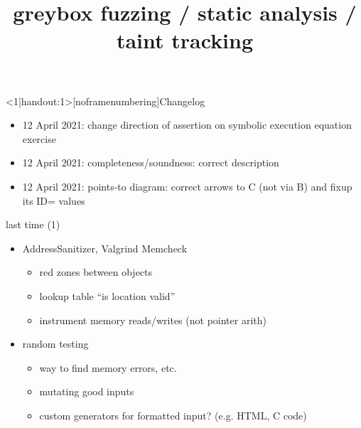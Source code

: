 \graphicspath{{./figures/}}
\title{greybox fuzzing / static analysis / taint tracking}
\date{}

\begin{frame}
    \titlepage
\end{frame}

{
\begin{frame}<1|handout:1>[noframenumbering]{Changelog}
    \begin{itemize}
    \item 12 April 2021: change direction of assertion on symbolic execution equation exercise
    \item 12 April 2021: completeness/soundness: correct description
    \item 12 April 2021: points-to diagram: correct arrows to C (not via B) and  fixup its ID= values
    \end{itemize}
\end{frame}
}


\begin{frame}{last time (1)}
    \begin{itemize}
    \item AddressSanitizer, Valgrind Memcheck
        \begin{itemize}
        \item red zones between objects
        \item lookup table ``is location valid''
        \item instrument memory reads/writes (not pointer arith)
        \end{itemize}
    \item random testing
        \begin{itemize}
        \item way to find memory errors, etc.
        \item mutating good inputs
        \item custom generators for formatted input? (e.g. HTML, C code)
        \end{itemize}
    \end{itemize}
\end{frame}

